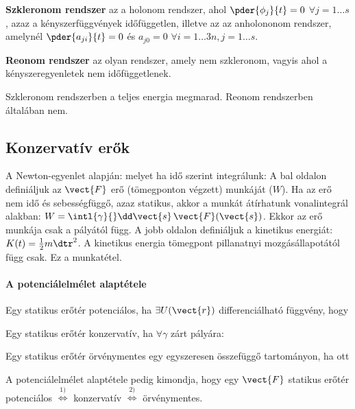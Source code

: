    {\bf Szkleronom rendszer} az a holonom rendszer, ahol $\pder{\phi_j}{t}=0$ $\forall j=1\dots s$, azaz a kényszerfüggvények időfüggetlen, illetve az az anholononom rendszer, amelynél $\pder{a_{ji}}{t}=0$ és $a_{j0}=0$ $\forall i=1\dots 3n, j=1\dots s$. 
   
   {\bf Reonom rendszer} az olyan rendszer, amely nem szkleronom, vagyis ahol a kényszeregyenletek nem időfüggetlenek. 
   
   Szkleronom rendszerben a teljes energia megmarad.
   Reonom rendszerben általában nem.
   
  \subsection{Konzervatív erők}
   
   A Newton-egyenlet alapján:
   melyet ha idő szerint integrálunk:
   A bal oldalon definiáljuk az $\vect{F}$ erő (tömegponton végzett) munkáját ($W$).
   Ha az erő nem idő és sebességfüggő, azaz statikus, akkor a munkát átírhatunk vonalintegrál alakban: $W=\intl{\gamma}{}\dd\vect{s}\,\vect{F}(\vect{s})$.
   Ekkor az erő munkája csak a pályától függ.
   A jobb oldalon definiáljuk a kinetikus energiát: $K(t)=\frac{1}{2}m\dtr^2$.
   A kinetikus energia tömegpont pillanatnyi mozgásállapotától függ csak.
   Ez a munkatétel.
   
   \paragraph{A potenciálelmélet alaptétele}
   
    Egy statikus erőtér potenciálos, ha $\exists U(\vect{r})$ differenciálható függvény, hogy 
    
    Egy statikus erőtér konzervatív, ha $\forall\gamma$ zárt pályára:
     
    Egy statikus erőtér örvénymentes egy egyszeresen összefüggő tartományon, ha ott
    
    A potenciálelmélet alaptétele pedig kimondja, hogy egy $\vect{F}$ statikus erőtér  potenciálos $\overset{1)}{\Leftrightarrow}$ konzervatív $\overset{2)}{\Leftrightarrow}$ örvénymentes. 
    
